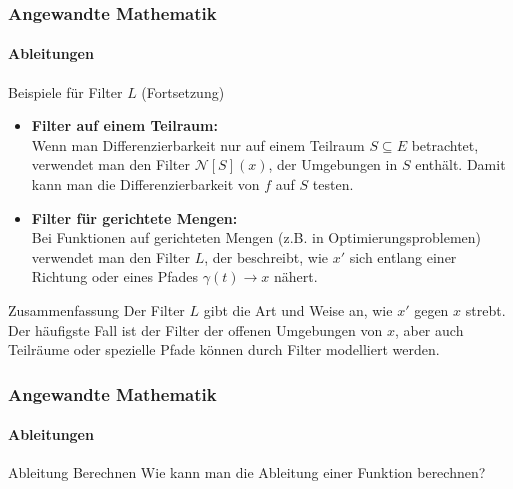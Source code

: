 \documentclass{beamer}
\begin{document}
\begin{frame}
    \frametitle{Angewandte Mathematik}
    \framesubtitle{Ableitungen}

\begin{block}{Beispiele für Filter \( L \) (Fortsetzung)}
  \begin{itemize}
      
    \item \textbf{Filter auf einem Teilraum:} \\
    Wenn man Differenzierbarkeit nur auf einem Teilraum \( S \subseteq E \) betrachtet, verwendet man den Filter \( \mathcal{N}[S](x) \), der Umgebungen in \( S \) enthält. Damit kann man die Differenzierbarkeit von \( f \) auf \( S \) testen.
  
    \item \textbf{Filter für gerichtete Mengen:} \\
    Bei Funktionen auf gerichteten Mengen (z.B. in Optimierungsproblemen) verwendet man den Filter \( L \), der beschreibt, wie \( x' \) sich entlang einer Richtung oder eines Pfades \( \gamma(t) \to x \) nähert.
  \end{itemize}
\end{block}

\vspace{-0.5cm} %

\begin{block}{Zusammenfassung}
  Der Filter \( L \) gibt die Art und Weise an, wie \( x' \) gegen \( x \) strebt. Der häufigste Fall ist der Filter der offenen Umgebungen von \( x \), aber auch Teilräume oder spezielle Pfade können durch Filter modelliert werden.
\end{block}

\end{frame}


    \begin{frame}
        \frametitle{Angewandte Mathematik}
        \framesubtitle{Ableitungen}
        \begin{block}{Ableitung Berechnen}
            Wie kann man die Ableitung einer Funktion berechnen?
        \end{block}
    
    \end{frame}
\end{document}
